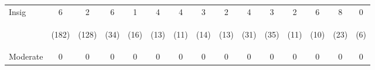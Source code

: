 \begin{tabular}{lcccccccccccccc}
\hline \noalign{\smallskip}Insig & 6 & 2 & 6 & 1 & 4 & 4 & 3 & 2 & 4 & 3 & 2 & 6 & 8 & 0\\
 & \begin{footnotesize}(182)\end{footnotesize} & \begin{footnotesize}(128)\end{footnotesize} & \begin{footnotesize}(34)\end{footnotesize} & \begin{footnotesize}(16)\end{footnotesize} & \begin{footnotesize}(13)\end{footnotesize} & \begin{footnotesize}(11)\end{footnotesize} & \begin{footnotesize}(14)\end{footnotesize} & \begin{footnotesize}(13)\end{footnotesize} & \begin{footnotesize}(31)\end{footnotesize} & \begin{footnotesize}(35)\end{footnotesize} & \begin{footnotesize}(11)\end{footnotesize} & \begin{footnotesize}(10)\end{footnotesize} & \begin{footnotesize}(23)\end{footnotesize} & \begin{footnotesize}(6)\end{footnotesize}\\
\noalign{\smallskip}Moderate & 0 & 0 & 0 & 0 & 0 & 0 & 0 & 0 & 0 & 0 & 0 & 0 & 0 & 0\\

\end{tabular}
